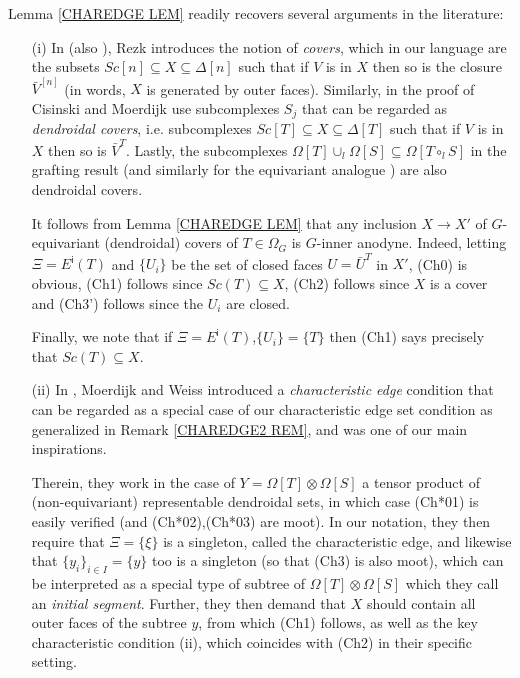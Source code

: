 \documentclass[a4paper,10pt,draft]{article}%
\begin{document}
\begin{remark} Lemma \ref{CHAREDGE LEM} readily recovers several arguments in the literature:
\begin{itemize}
\item[(i)] In \cite[\S 10]{Rez01} (also \cite[\S 6.2]{Rez10}), Rezk introduces the notion of \textit{covers}, which in our language are the subsets
$Sc[n] \subseteq X \subseteq \Delta[n]$
such that if $V$ is in $X$ then so is the closure $\bar{V}^{[n]}$
(in words, $X$ is generated by outer faces).
Similarly, in the proof of \cite[Prop. 2.4]{CM13a}
Cisinski and Moerdijk use subcomplexes $S_j$ that can be regarded as
\textit{dendroidal covers},
i.e. subcomplexes
$Sc[T] \subseteq X \subseteq \Delta[T]$
such that if $V$ is in $X$ then so is $\bar{V}^{T}$.
Lastly, the subcomplexes 
$\Omega[T] \cup_l \Omega[S] \subseteq \Omega[T \circ_l S]$
in the grafting result \cite[Lemma 5.2]{MW09} (and similarly for the equivariant analogue \cite[Prop. 6.19]{Per17}) are also dendroidal covers.

It follows from Lemma \ref{CHAREDGE LEM}
that any inclusion $X \to X'$ of $G$-equivariant (dendroidal) covers of $T\in \Omega_G$
is $G$-inner anodyne. 
Indeed, letting $\Xi = E^{\mathsf{i}}(T)$ and $\{U_i\}$ be the set of closed faces $U = \bar{U}^T$ in $X'$, (Ch0) is obvious, (Ch1) follows since 
$Sc(T) \subseteq X$, (Ch2) follows since $X$ is a cover and
(Ch3') follows since the $U_i$ are closed.

Finally, we note that if $\Xi=E^{\mathsf{i}}(T)$,$\{U_i\}=\{T\}$
then (Ch1) says precisely that $Sc(T) \subseteq X$.

\item[(ii)] In \cite[Lemma 9.7]{MW09}, Moerdijk and Weiss introduced a \textit{characteristic edge} condition that can be regarded as a special case of our characteristic edge set condition as generalized in Remark \ref{CHAREDGE2 REM}, and was one of our main inspirations.

Therein, they work in the case of $Y= \Omega[T] \otimes \Omega[S]$
a tensor product of (non-equivariant) representable dendroidal sets, in which case (Ch*01) is easily verified 
(and (Ch*02),(Ch*03) are moot).
In our notation, they then require that
$\Xi = \{\xi\}$ is a singleton, called the characteristic edge,
and likewise that $\{y_i\}_{i\in I}=\{y\}$ too is a singleton (so that (Ch3) is also moot), which can be interpreted as a special type of subtree of 
$\Omega[T] \otimes \Omega[S]$ which they call an \textit{initial segment}.
Further, they then demand that $X$ should contain all outer faces of the subtree $y$, from which (Ch1) follows, 
as well as the key characteristic condition 
\cite[Lemma 9.7]{MW09}(ii),
which coincides with (Ch2) in their specific setting.


\end{itemize}
\end{remark}
\end{document}
